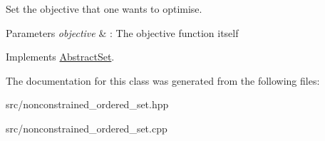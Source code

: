 Set the objective that one wants to optimise. 


\begin{DoxyParams}{Parameters}
{\em objective} & \-: The objective function itself \\
\hline
\end{DoxyParams}


Implements \hyperlink{classAbstractSet_a7aef71679a18ab7965d1098da15b26c2}{Abstract\-Set}.



The documentation for this class was generated from the following files\-:\begin{DoxyCompactItemize}
\item 
src/nonconstrained\-\_\-ordered\-\_\-set.\-hpp\item 
src/nonconstrained\-\_\-ordered\-\_\-set.\-cpp\end{DoxyCompactItemize}
